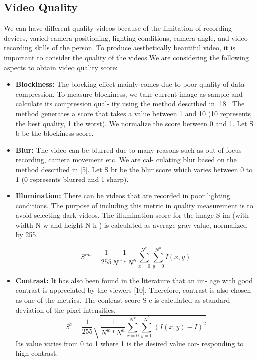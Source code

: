 \documentclass{sig-alternate}
\begin{document}
\subsection{Video Quality}
We can have different quality videos because of the limitation of recording devices, varied camera positioning, lighting conditions, camera angle, and video recording skills of the person. To produce aesthetically beautiful video, it is important to consider the quality of the videos.We are considering the following aspects to obtain video quality score:
\begin{itemize}
\item \textbf{Blockiness:} The blocking effect mainly comes due to poor
quality of data compression. To measure blockiness, we take
current image as sample and calculate its compression qual-
ity using the method described in [18]. The method generates
a score that takes a value between 1 and 10 (10 represents the
best quality, 1 the worst). We normalize the score between 0
and 1. Let S b be the blockiness score.
\item \textbf{Blur:} The video can be blurred due to many reasons such as
out-of-focus recording, camera movement etc. We are cal-
culating blur based on the method described in [5]. Let S br
be the blur score which varies between 0 to 1 (0 represents
blurred and 1 sharp).
\item \textbf{Illumination:} There can be videos that are recorded in poor
lighting conditions. The purpose of including this metric in
quality measurement is to avoid selecting dark videos. The
illumination score for the image S im (with width N w and
height N h ) is calculated as average gray value, normalized
by 255.

\begin{equation}
 S^{im} = \frac{1}{255}\frac{1}{N^w * N^h}\sum_{x=0}^{N^w}\sum_{y=0}^{N^h}I(x,y) 
\end{equation}
\item \textbf{Contrast:} It has also been found in the literature that an im-
age with good contrast is appreciated by the viewers [10].
Therefore, contrast is also chosen as one of the metrics. The
contrast score S c is calculated as standard deviation of the
pixel intensities.
\begin{equation}
S^c = \frac{1}{255} \sqrt{\frac{1}{N^w * N^h}\sum_{x=0}^{N^w}\sum_{y=0}^{N^h}(I(x,y) - I)^2}
\end{equation}
Its value varies from 0 to 1 where 1 is the desired value cor-
responding to high contrast.


\end{itemize}
\end{document}
